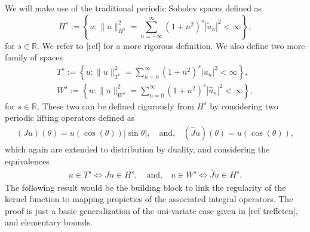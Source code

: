 \documentclass{article}
\newcommand{\todo}[1]{{\color{red}[#1]}}
\newcommand{\IR}{{\mathbb R}}
\begin{document}
We will make use of the traditional periodic Sobolev spaces defined as 
$$
H^s := \left\lbrace u : \| u\|_{H^s}^2 = \sum_{n=-\infty}^\infty (1+n^2)^s |\widetilde{u}_n|^2 < \infty \right\rbrace,
$$
for $s\in \IR$. We refer to \todo{ref} for a more rigorous definition. We also define two more family of spaces
\begin{align*}
T^s := \left\lbrace u : \| u\|_{T^s}^2 = \sum_{n=0}^\infty (1+n^2)^s |{u}_n|^2 < \infty \right\rbrace, \\
W^s := \left\lbrace u : \| u\|_{W^s}^2 = \sum_{n=0}^\infty (1+n^2)^s |\widehat{u}_n|^2 < \infty \right\rbrace,
\end{align*} 
for $s \in \IR$. These two can be defined rigurously from $H^s$ by considering two periodic lifting operators defined as 
\begin{align*}
(Ju) (\theta) = u(\cos(\theta)) | \sin \theta|, \quad \text{and,} \quad
(\widehat{J}u)(\theta) = u (\cos(\theta)),
\end{align*}
which again are extended to distribution by duality, and considering the equivalences 
\begin{align*}
u \in T^s \Leftrightarrow Ju \in H^s, \quad \text{and,} \quad u \in W^s \Leftrightarrow \widehat{J}u \in H^s.
\end{align*}
The following result would be the building block to link the regularity of the kernel function to mapping propieties of the associated integral operators. The proof is just a basic generalization of the uni-variate case given in \todo{ref treffeten}, and elementary bounds.
\end{document}
